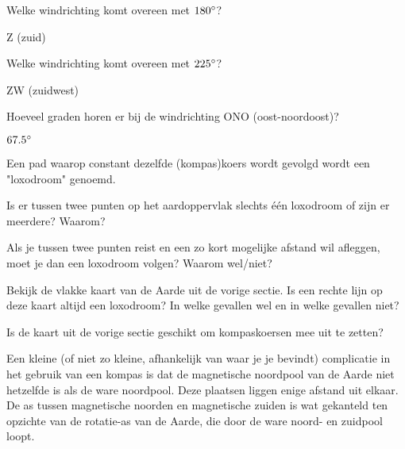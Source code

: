 \begin{opgave}
	\begin{subopgave}
		Welke windrichting komt overeen met $180\degree$?
		\begin{antwoord}
			Z (zuid)
		\end{antwoord}
	\end{subopgave}
	\begin{subopgave}
		Welke windrichting komt overeen met $225\degree$?
		\begin{antwoord}
			ZW (zuidwest)
		\end{antwoord}
	\end{subopgave}
	\begin{subopgave}
		Hoeveel graden horen er bij de windrichting ONO (oost-noordoost)?
		\begin{antwoord}
			$67.5\degree$
		\end{antwoord}
	\end{subopgave}
\end{opgave}

Een pad waarop constant dezelfde (kompas)koers wordt gevolgd wordt een "loxodroom" genoemd.

\begin{opgave}
	\begin{subopgave}
		Is er tussen twee punten op het aardoppervlak slechts \'e\'en loxodroom of  zijn er meerdere? Waarom?
	\end{subopgave}
	\begin{subopgave}
		Als je tussen twee punten reist en een zo kort mogelijke afstand wil afleggen, moet je dan een loxodroom volgen? Waarom wel/niet?
	\end{subopgave}
\end{opgave}

\begin{opgave}[\ster]
	\begin{subopgave}
		Bekijk de vlakke kaart van de Aarde uit de vorige sectie. Is een rechte lijn op deze kaart altijd een loxodroom? In welke gevallen wel en in welke gevallen niet?
	\end{subopgave}
	\begin{subopgave}
		Is de kaart uit de vorige sectie geschikt om kompaskoersen mee uit te zetten?
	\end{subopgave}
\end{opgave}
	
Een kleine (of niet zo kleine, afhankelijk van waar je je bevindt) complicatie in het gebruik van een kompas is dat de magnetische noordpool van de Aarde niet hetzelfde is als de ware noordpool. Deze plaatsen liggen enige afstand uit elkaar. De as tussen magnetische noorden en magnetische zuiden is wat gekanteld ten opzichte van de rotatie-as van de Aarde, die door de ware noord- en zuidpool loopt.

